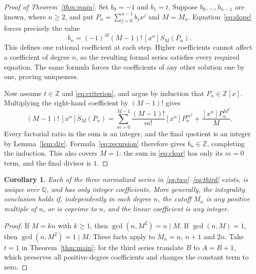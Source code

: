 \documentclass[11pt]{article}
\newtheorem{corollary}[theorem]{Corollary}
\newcommand{\Q}{\mathbb{Q}}
\newcommand{\Z}{\mathbb{Z}}
\begin{document}
\begin{proof}[Proof of Theorem~\ref{thm:main}]
Set $b_0=-1$ and $b_1=t$. Suppose $b_0,\ldots,b_{n-1}$ are known, where
$n\geq2$, and put $P_n=\sum_{j=0}^{n-1}b_jx^j$ and $M=M_n$.
Equation~\eqref{eq:slope} forces precisely the value
\begin{equation}\label{eq:recursion}
 b_n=(-1)^M(M-1)!\,[x^n]S_M(P_n).
\end{equation}
This defines one rational coefficient at each step. Higher coefficients cannot
affect a coefficient of degree $n$, so the resulting formal series satisfies
every required equation. The same formula forces the coefficients of any other
solution one by one, proving uniqueness.

Now assume $t\in\Z$ and \eqref{eq:criterion}, and argue by induction that
$P_n\in\Z[x]$. Multiplying the right-hand coefficient by $(M-1)!$ gives
\begin{equation}\label{eq:clear}
 (M-1)!\,[x^n]S_M(P_n)
 =\sum_{m=0}^{M-1}\frac{(M-1)!}{m!}[x^n]P_n^{m^2}
   +\frac{[x^n]P_n^{M^2}}{M}.
\end{equation}
Every factorial ratio in the sum is an integer, and the final quotient is an
integer by Lemma~\ref{lem:div}. Formula~\eqref{eq:recursion} therefore gives
$b_n\in\Z$, completing the induction. This also covers $M=1$: the sum in
\eqref{eq:clear} has only its $m=0$ term, and the final divisor is $1$.
\end{proof}

\begin{corollary}\label{cor:hanna}
Each of the three normalized series in
\eqref{eq:two}--\eqref{eq:third} exists, is unique over $\Q$, and has only
integer coefficients.
More generally, the integrality conclusion holds if, independently in each
degree $n$, the cutoff $M_n$ is any positive multiple of $n$, or is coprime
to $n$, and the linear coefficient is any integer.
\end{corollary}
\begin{proof}
If $M=kn$ with $k\geq1$, then $\gcd(n,M^2)=n\mid M$.
If $\gcd(n,M)=1$, then $\gcd(n,M^2)=1\mid M$.
These facts apply to $M_n=n$, $n+1$ and $2n$.
Take $t=1$ in Theorem~\ref{thm:main}; for the third series translate $B$ to
$A=B+1$, which preserves all positive-degree coefficients and changes the
constant term to zero.
\end{proof}
\end{document}
